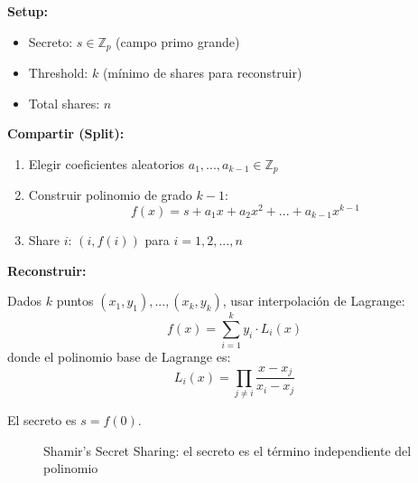 \documentclass[11pt,a4paper,twoside]{book}
\theoremstyle{definition}
\theoremstyle{remark}
\begin{document}
\begin{mathnote}
\textbf{Setup:}
\begin{itemize}
    \item Secreto: $s \in \mathbb{Z}_p$ (campo primo grande)
    \item Threshold: $k$ (mínimo de shares para reconstruir)
    \item Total shares: $n$
\end{itemize}

\textbf{Compartir (Split):}
\begin{enumerate}
    \item Elegir coeficientes aleatorios $a_1, ..., a_{k-1} \in \mathbb{Z}_p$
    \item Construir polinomio de grado $k-1$:
    \[
    f(x) = s + a_1 x + a_2 x^2 + ... + a_{k-1} x^{k-1}
    \]
    \item Share $i$: $(i, f(i))$ para $i = 1, 2, ..., n$
\end{enumerate}

\textbf{Reconstruir:}

Dados $k$ puntos $(x_1, y_1), ..., (x_k, y_k)$, usar interpolación de Lagrange:
\[
f(x) = \sum_{i=1}^{k} y_i \cdot L_i(x)
\]
donde el polinomio base de Lagrange es:
\[
L_i(x) = \prod_{j \neq i} \frac{x - x_j}{x_i - x_j}
\]

El secreto es $s = f(0)$.
\end{mathnote}

\begin{figure}[htbp]
\centering
{}
\caption{Shamir's Secret Sharing: el secreto es el término independiente del polinomio}
\label{fig:shamir-visual}
\end{figure}
\end{document}
